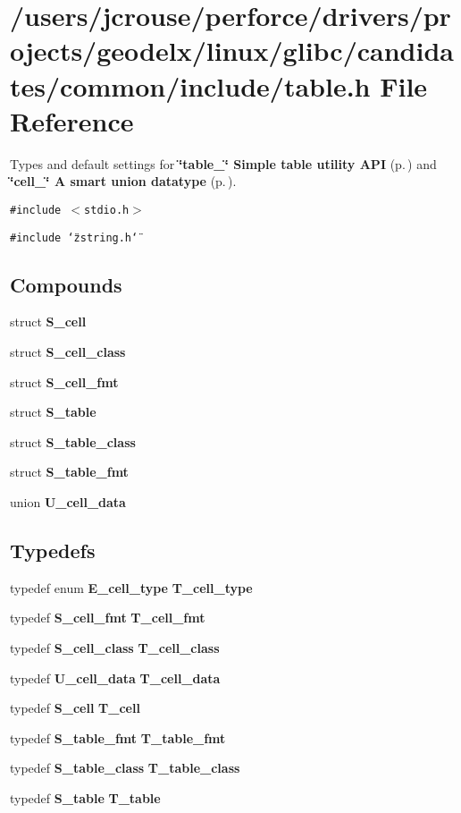 \section{/users/jcrouse/perforce/drivers/projects/geodelx/linux/glibc/candidates/common/include/table.h File Reference}
\label{table_8h}
Types and default settings for {\bf \char`\"{}table\_\-\char`\"{} Simple table utility API} {\rm (p.\,\pageref{group__simple__table})} and {\bf \char`\"{}cell\_\-\char`\"{} A smart union datatype} {\rm (p.\,\pageref{group__table__cell})}. 


{\tt \#include $<$stdio.h$>$}\par
{\tt \#include \char`\"{}zstring.h\char`\"{}}\par
\subsection*{Compounds}
\begin{CompactItemize}
\item 
struct {\bf S\_\-cell}
\item 
struct {\bf S\_\-cell\_\-class}
\item 
struct {\bf S\_\-cell\_\-fmt}
\item 
struct {\bf S\_\-table}
\item 
struct {\bf S\_\-table\_\-class}
\item 
struct {\bf S\_\-table\_\-fmt}
\item 
union {\bf U\_\-cell\_\-data}
\end{CompactItemize}
\subsection*{Typedefs}
\begin{CompactItemize}
\item 
typedef enum {\bf E\_\-cell\_\-type} {\bf T\_\-cell\_\-type}
\item 
typedef {\bf S\_\-cell\_\-fmt} {\bf T\_\-cell\_\-fmt}
\item 
typedef {\bf S\_\-cell\_\-class} {\bf T\_\-cell\_\-class}
\item 
typedef {\bf U\_\-cell\_\-data} {\bf T\_\-cell\_\-data}
\item 
typedef {\bf S\_\-cell} {\bf T\_\-cell}
\item 
typedef {\bf S\_\-table\_\-fmt} {\bf T\_\-table\_\-fmt}
\item 
typedef {\bf S\_\-table\_\-class} {\bf T\_\-table\_\-class}
\item 
typedef {\bf S\_\-table} {\bf T\_\-table}
\end{CompactItemize}
